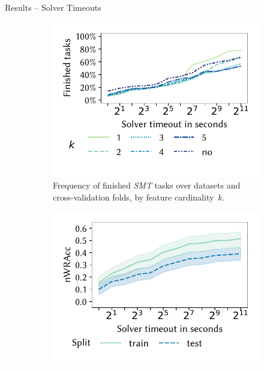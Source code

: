\documentclass[en, navbaroff, handout]{sdqbeamer}
\begin{document}
\begin{frame}[t]{Results -- Solver Timeouts}
	\begin{figure}
		\centering
		\begin{subfigure}[t]{0.32\textwidth}
			\centering
			\includegraphics[width=\textwidth, trim=10 25 10 10, clip]{plots/csd-timeouts-finished-tasks.pdf}
			\caption{
				Frequency of finished \emph{SMT} tasks over datasets and cross-validation folds, by feature cardinality~$k$.
			}
			\label{fig:csd:timeouts-finished-tasks}
		\end{subfigure}
		\hspace{1cm}
		\begin{subfigure}[t]{0.32\textwidth}
			\centering
			\includegraphics[width=\textwidth, trim=10 25 10 10, clip]{plots/csd-timeouts-nwracc.pdf}

\end{subfigure}
\end{figure}
\end{frame}
\end{document}

